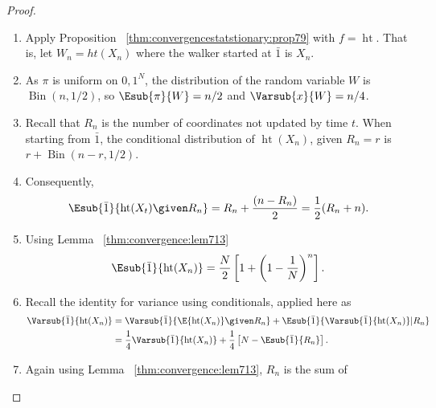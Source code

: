 \documentclass[12pt]{article}
\begin{document}
\begin{proof}
    \begin{enumerate}
        \item
            Apply Proposition~%
            \ref{thm:convergencestatstionary:prop79} with \( f =
            \operatorname{ht}
            \).  That is, let \( W_n = ht(X_n) \) where the walker
            started at \( \bar{1} \) is \( X_n \).
        \item
            As \( \pi \) is uniform on \( {0,1}^N \), the distribution
            of the random variable \( W \) is \(
            \operatorname{Bin}
            (n,1/2) \), so \( \Esub{\pi}{W} = n/2 \) and \( \Varsub{x}{W}
            = n/4 \).
        \item
            Recall that \( R_n \) is the number of coordinates not
            updated by time \( t \).  When starting from \( \bar{1} \),
            the conditional distribution of \(
            \operatorname{ht}
            (X_n) \), given \( R_n = r \) is \( r +
            \operatorname{Bin}
            (n-r, 1/2) \).
        \item
            Consequently,
            \[
                \Esub{\bar{1}}{%
                \operatorname{ht}
                (X_{t}) \given R_n} = R_n + \frac{(n-R_n)}{2} = \frac{1}
                {2}(R_n + n).
            \]
        \item
            Using Lemma~%
            \ref{thm:convergence:lem713}
            \[
                \Esub{\bar{1}}{%
                \operatorname{ht}
                (X_n)} = \frac{N}{2} \left[ 1 + \left( 1- \frac{1}{N}
                \right)^n \right].
            \]
        \item
            Recall the identity for variance using conditionals, applied
            here as
            \begin{align*}
                \Varsub{\bar{1}}{%
                \operatorname{ht}
                (X_n)} &= \Varsub{\bar{1}}{\E{%
                \operatorname{ht}
                (X_n)} \given R_n} + \Esub{\bar{1}}{\Varsub{\bar{1}}{%
                \operatorname{ht}
                (X_n)} | R_n} \\
                &= \frac{1}{4} \Varsub{\bar{1}}{%
                \operatorname{ht}
                (X_n)} + \frac{1}{4} \left[ N - \Esub{\bar{1}}{R_n}
                \right].
            \end{align*}
        \item
            Again using Lemma~%
            \ref{thm:convergence:lem713}, \( R_n \) is the sum of

\end{enumerate}
\end{proof}
\end{document}

